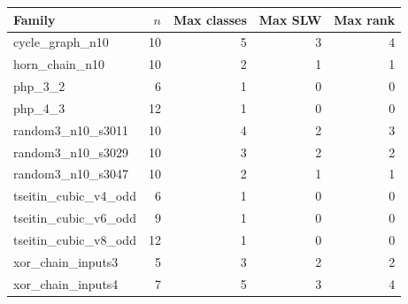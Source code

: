 \begin{tabular}{lrrrr}
\toprule
Family & $n$ & Max classes & Max SLW & Max rank \\
\midrule
cycle\_graph\_n10 & 10 & 5 & 3 & 4 \\
horn\_chain\_n10 & 10 & 2 & 1 & 1 \\
php\_3\_2 & 6 & 1 & 0 & 0 \\
php\_4\_3 & 12 & 1 & 0 & 0 \\
random3\_n10\_s3011 & 10 & 4 & 2 & 3 \\
random3\_n10\_s3029 & 10 & 3 & 2 & 2 \\
random3\_n10\_s3047 & 10 & 2 & 1 & 1 \\
tseitin\_cubic\_v4\_odd & 6 & 1 & 0 & 0 \\
tseitin\_cubic\_v6\_odd & 9 & 1 & 0 & 0 \\
tseitin\_cubic\_v8\_odd & 12 & 1 & 0 & 0 \\
xor\_chain\_inputs3 & 5 & 3 & 2 & 2 \\
xor\_chain\_inputs4 & 7 & 5 & 3 & 4 \\
\bottomrule
\end{tabular}